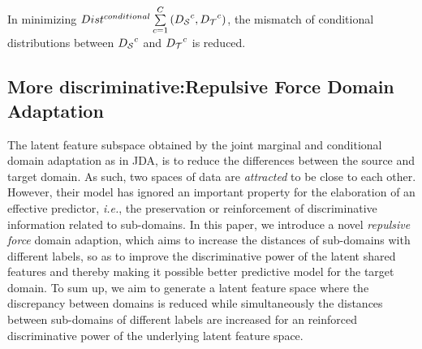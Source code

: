 \documentclass[10pt,twocolumn,letterpaper]{article}
\begin{document}
\begin{CJK*}{UTF8}{gkai}

In minimizing ${Dis{t^{conditional}}\sum\limits_{c = 1}^C {({D_{\cal S}}^c,{D_{\cal T}}^c)} }$,  the mismatch of conditional distributions between ${{D_{\cal S}}^c}$ and ${{D_{\cal T}}^c}$ is reduced. 


\subsection{More discriminative:Repulsive Force Domain Adaptation}

The latent feature subspace obtained by the joint marginal and conditional domain adaptation as in JDA, is to reduce the differences between the source and target domain. As such, two spaces of data are \emph{attracted}  to be close to each other. However, their model has ignored an important property for the elaboration of an effective predictor,  \textit{i.e.},  the preservation or reinforcement of  discriminative information related to sub-domains. In this paper, we introduce a novel \textit{repulsive force} domain adaption, which aims to increase the distances of sub-domains with different labels, so as to improve the discriminative power of the latent shared features and thereby making it possible better predictive model for the target domain. To sum up, we aim to generate a latent feature space where the discrepancy between domains is reduced while simultaneously the distances between sub-domains of different labels are increased for an reinforced discriminative power of the underlying latent feature space.


\end{CJK*}
\end{document}
